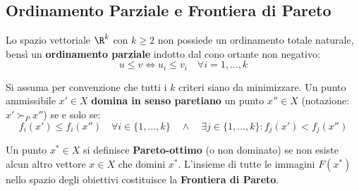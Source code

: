 \subsection{Ordinamento Parziale e Frontiera di Pareto}
Lo spazio vettoriale $\R^k$ con $k \ge 2$ non possiede un ordinamento totale naturale, bens\`i un \textbf{ordinamento parziale} indotto dal cono ortante non negativo:
\begin{equation}
u \le v \iff u_i \le v_i \quad \forall i = 1, \dots, k
\end{equation}

\begin{definition}
Si assuma per convenzione che tutti i $k$ criteri siano da minimizzare. Un punto ammissibile $x' \in X$ \textbf{domina in senso paretiano} un punto $x'' \in X$ (notazione: $x' \succ_P x''$) se e solo se:
\begin{equation}
f_i(x') \le f_i(x'') \quad \forall i \in \{1, \dots, k\} \quad \land \quad \exists j \in \{1, \dots, k\} : f_j(x') < f_j(x'')
\end{equation}
\end{definition}

\begin{definition}
Un punto $x^* \in X$ si definisce \textbf{Pareto-ottimo} (o non dominato) se non esiste alcun altro vettore $x \in X$ che domini $x^*$. L'insieme di tutte le immagini $F(x^*)$ nello spazio degli obiettivi costituisce la \textbf{Frontiera di Pareto}.
\end{definition}

